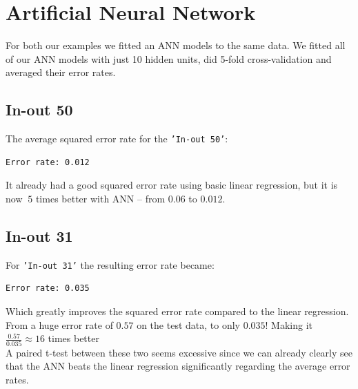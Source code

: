 \section{Artificial Neural Network}
For both our examples we fitted an ANN models to the same data. We fitted all of our ANN models with just 10 hidden units, did 5-fold cross-validation and averaged their error rates. 

\subsection*{In-out 50}
The average squared error rate for the \texttt{'In-out 50'}:

\begin{verbatim}
Error rate: 0.012
\end{verbatim}

It already had a good squared error rate using basic linear regression, but it is now $~5$ times better with ANN -- from $0.06$ to $0.012$.

\subsection*{In-out 31}
For \texttt{'In-out 31'} the resulting error rate became:

\begin{verbatim}
Error rate: 0.035
\end{verbatim}

Which greatly improves the squared error rate compared to the linear regression. From a huge error rate of $0.57$ on the test data, to only $0.035$! Making it $\frac{0.57}{0.035} \approx 16$ times better \\

A paired t-test between these two seems excessive since we can already clearly see that the ANN beats the linear regression significantly regarding the average error rates.

